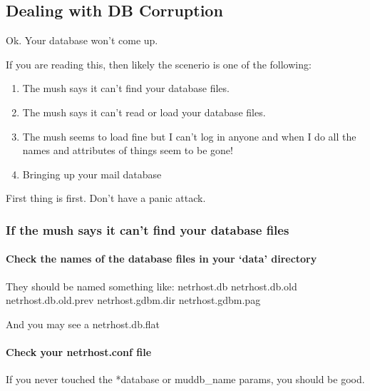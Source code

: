 \documentclass[letterpaper,10pt,english]{sphinxmanual}
\begin{document}
\subsection{Dealing with DB Corruption}
\label{\detokenize{troubleshooting:dealing-with-db-corruption}}
\sphinxAtStartPar
Ok.  Your database won’t come up.

\sphinxAtStartPar
If you are reading this, then likely the scenerio is one of the following:
\begin{enumerate}
%
\item {} 
\sphinxAtStartPar
The mush says it can’t find your database files.

\item {} 
\sphinxAtStartPar
The mush says it can’t read or load your database files.

\item {} 
\sphinxAtStartPar
The mush seems to load fine but I can’t log in anyone and when I do
all the names and attributes of things seem to be gone!

\item {} 
\sphinxAtStartPar
Bringing up your mail database

\end{enumerate}

\sphinxAtStartPar
First thing is first.  Don’t have a panic attack.


\subsubsection{If the mush says it can’t find your database files}
\label{\detokenize{troubleshooting:if-the-mush-says-it-can-t-find-your-database-files}}

\paragraph{Check the names of the database files in your ‘data’ directory}
\label{\detokenize{troubleshooting:check-the-names-of-the-database-files-in-your-data-directory}}
\sphinxAtStartPar
They should be named something like:
netrhost.db
netrhost.db.old
netrhost.db.old.prev
netrhost.gdbm.dir
netrhost.gdbm.pag

\sphinxAtStartPar
And you may see a netrhost.db.flat


\paragraph{Check your netrhost.conf file}
\label{\detokenize{troubleshooting:check-your-netrhost-conf-file}}
\sphinxAtStartPar
If you never touched the *database or muddb\_name params, you should be good.
\end{document}
